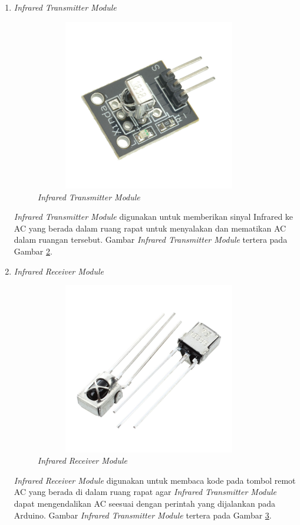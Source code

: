 \begin{enumerate}
\begin{figure}[H]
{		}
		\caption{Lampu LED}
		\label{figure:led}
	\end{figure}
	\tab Lampu LED digunakan sebagai prototipe dari lampu ruangan. Lampu LED akan menyala ketika perintah untuk menyalakan lampu dijalankan. Lampu LED yang kami gunakan berukuran 5 mm. Gambar Lampu LED tertera pada Gambar \ref{figure:led}.
	\pagebreak
	\item \textit{Infrared Transmitter Module}
	\begin{figure}[H]
		\centerline {
			\includegraphics[width=10cm,height=7.5cm]{bab5/img/transmitter.png}
		}
		\caption{\textit{Infrared Transmitter Module}}
		\label{figure:transmitter}
	\end{figure}
	\tab \textit{Infrared Transmitter Module} digunakan untuk memberikan sinyal Infrared ke AC yang berada dalam ruang rapat untuk menyalakan dan mematikan AC dalam ruangan tersebut. Gambar \textit{Infrared Transmitter Module} tertera pada Gambar \ref{figure:transmitter}.
	\pagebreak
	\item \textit{Infrared Receiver Module}
	\begin{figure}[H]
		\centerline {
			\includegraphics[width=10cm,height=7.5cm]{bab5/img/receiver.png}
		}
		\caption{\textit{Infrared Receiver Module}}
		\label{figure:receiver}
	\end{figure}
	\tab \textit{Infrared Receiver Module} digunakan untuk membaca kode pada tombol remot AC yang berada di dalam ruang rapat agar \textit{Infrared Transmitter Module} dapat mengendalikan AC seesuai dengan perintah yang dijalankan pada Arduino. Gambar \textit{Infrared Transmitter Module} tertera pada Gambar \ref{figure:receiver}.
\end{enumerate}
